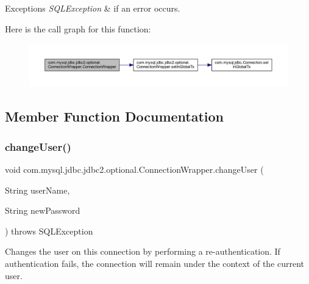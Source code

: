 \begin{DoxyExceptions}{Exceptions}
{\em S\+Q\+L\+Exception} & if an error occurs. \\
\hline
\end{DoxyExceptions}
Here is the call graph for this function\+:
\nopagebreak
\begin{figure}[H]
\begin{center}
\leavevmode
\includegraphics[width=350pt]{classcom_1_1mysql_1_1jdbc_1_1jdbc2_1_1optional_1_1_connection_wrapper_a4300303d3f60a9a817eb9db03d583034_cgraph}
\end{center}
\end{figure}


\subsection{Member Function Documentation}
\mbox{\label{classcom_1_1mysql_1_1jdbc_1_1jdbc2_1_1optional_1_1_connection_wrapper_a4c5b794f1bdf800b863c46fdcbf2ce97}} 
\subsubsection{\texorpdfstring{change\+User()}{changeUser()}}
{\footnotesize\ttfamily void com.\+mysql.\+jdbc.\+jdbc2.\+optional.\+Connection\+Wrapper.\+change\+User (\begin{DoxyParamCaption}\item[{String}]{user\+Name,  }\item[{String}]{new\+Password }\end{DoxyParamCaption}) throws S\+Q\+L\+Exception}

Changes the user on this connection by performing a re-\/authentication. If authentication fails, the connection will remain under the context of the current user.


